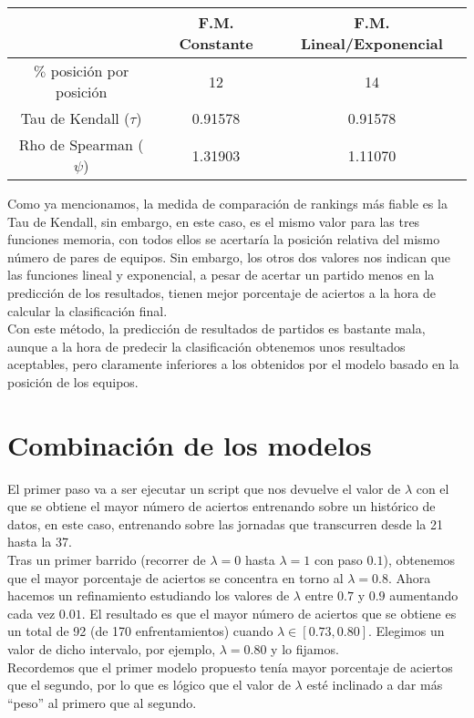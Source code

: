 \begin{center}
	\begin{tabular}{|c|c|c|}
	\hline  & F.M. Constante & F.M. Lineal/Exponencial \\ 
	\hline $\%$ posición por posición & 12 & 14 \\ 
	\hline Tau de Kendall ($\tau$) & 0.91578 & 0.91578 \\ 
	\hline Rho de Spearman ($\psi$) & 1.31903 & 1.11070 \\ 
	\hline 
\end{tabular} 
\end{center}

Como ya mencionamos, la medida de comparación de rankings más fiable es la Tau de Kendall, sin embargo, en este caso, es el mismo valor para las tres funciones memoria, con todos ellos se acertaría la posición relativa del mismo número de pares de equipos. Sin embargo, los otros dos valores nos indican que las funciones lineal y exponencial, a pesar de acertar un partido menos en la predicción de los resultados, tienen mejor porcentaje de aciertos a la hora de calcular la clasificación final.\\

Con este método, la predicción de resultados de partidos es bastante mala, aunque a la hora de predecir la clasificación obtenemos unos resultados aceptables, pero claramente inferiores a los obtenidos por el modelo basado en la posición de los equipos. 

\section{Combinación de los modelos}
El primer paso va a ser ejecutar un script que nos devuelve el valor de $\lambda$ con el que se obtiene el mayor número de aciertos entrenando sobre un histórico de datos, en este caso, entrenando sobre las jornadas que transcurren desde la 21 hasta la 37.\\

Tras un primer barrido (recorrer de $\lambda=0$ hasta $\lambda=1$ con paso $0.1$), obtenemos que el mayor porcentaje de aciertos se concentra en torno al $\lambda=0.8$. Ahora hacemos un refinamiento estudiando los valores de $\lambda$ entre $0.7$ y $0.9$ aumentando cada vez $0.01$. El resultado es que el mayor número de aciertos que se obtiene es un total de 92 (de 170 enfrentamientos) cuando $\lambda \in [0.73,0.80]$. Elegimos un valor de dicho intervalo, por ejemplo, $\lambda=0.80$ y lo fijamos. \\
Recordemos que el primer modelo propuesto tenía mayor porcentaje de aciertos que el segundo, por lo que es lógico que el valor de $\lambda$ esté inclinado a dar más ``peso'' al primero que al segundo. \\

